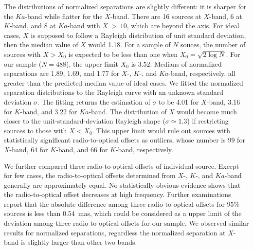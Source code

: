 \documentclass{aa}
\begin{document}
    The distributions of normalized separations are slightly different: it is sharper for the $Ka$-band while flatter for the $X$-band.
    There are 16 sources at $X$-band, 6 at $K$-band, and 8 at $Ka$-band with $X~>~10$, which are beyond the axis.
    For ideal cases, $X$ is supposed to follow a Rayleigh distribution of unit standard deviation, then the median value of $X$ would 1.18.
    For a sample of $N$ souces, the number of sources with $X>X_0$ is expected to be less than one when $X_0=\sqrt{2\log{N}}$.
    For our sample ($N=488$), the upper limit $X_0$ is 3.52.
    Medians of normalized separations are 1.89, 1.69, and 1.77 for $X$-, $K$-, and $Ka$-band, respectively, all greater than the predicted median value of ideal cases.
    We fitted the normalized separation distributions to the Rayleigh curve with an unknown standard deviation $\sigma$.
    The fitting returns the estimation of $\sigma$ to be 4.01 for $X$-band, 3.16 for $K$-band, and 3.22 for $Ka$-band.
    The distribution of $X$ would become much closer to the unit-standard-deviation Rayleigh shape ($\sigma \simeq 1.3$) if restricting sources to those with $X<X_0$.
    This upper limit would rule out sources with statistically significant radio-to-optical offsets as outliers, whose number is 99 for $X$-band, 64 for $K$-band, and 66 for $K$-band, respectively.

    We further compared three radio-to-optical offsets of individual source. %
    Except for few cases, the radio-to-optical offsets determined from $X$-, $K$-, and $Ka$-band generally are approximately equal.
    No statistically obvious evidence shows that the radio-to-optical offset decreases at high frequency.
    Further examinations report that the absolute difference among three radio-to-optical offsets for 95\% sources is less than 0.54~mas, which could be considered as a upper limit of the deviation among three radio-to-optical offsets for our sample.
    We observed similar results for normalized separations, regardless the normalized separation at $X$-band is slightly larger than other two bands.
\end{document}
